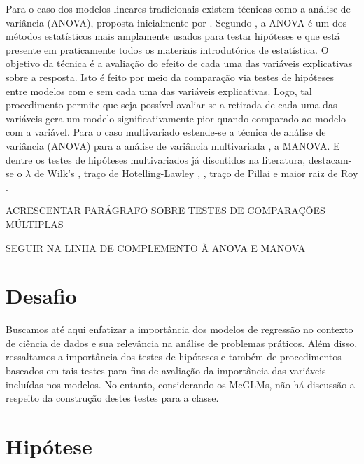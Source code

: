 Para o caso dos modelos lineares tradicionais existem técnicas como a análise de variância (ANOVA), proposta inicialmente por \citet{anova_fisher}. Segundo \citet{anova1}, a ANOVA é um dos métodos estatísticos mais amplamente usados para testar hipóteses e que está presente em praticamente todos os materiais introdutórios de estatística. O objetivo da técnica é a avaliação do efeito de cada uma das variáveis explicativas sobre a resposta. Isto é feito por meio da comparação via testes de hipóteses entre modelos com e sem cada uma das variáveis explicativas. Logo, tal procedimento permite que seja possível avaliar se a retirada de cada uma das variáveis gera um modelo significativamente pior quando comparado ao modelo com a variável. Para o caso multivariado estende-se a técnica de análise de variância (ANOVA) para a análise de variância  multivariada \citep{manova}, a MANOVA. E dentre os testes de hipóteses multivariados já discutidos na literatura, destacam-se o $\lambda$ de Wilk's \citep{wilks}, traço de Hotelling-Lawley \citep{lawley}, \citep{hotelling}, traço de Pillai \citep{pillai} e maior raiz de Roy \citep{roy}. 


ACRESCENTAR PARÁGRAFO SOBRE TESTES DE COMPARAÇÕES MÚLTIPLAS

SEGUIR NA LINHA DE COMPLEMENTO À ANOVA E MANOVA


\section{Desafio}

Buscamos até aqui enfatizar a importância dos modelos de regressão no contexto de ciência de dados e sua relevância na análise de problemas práticos. Além disso, ressaltamos a importância dos testes de hipóteses e também de procedimentos baseados em tais testes para fins de avaliação da importância das variáveis incluídas nos modelos. No entanto, considerando os McGLMs, não há discussão a respeito da construção destes testes para a classe.


\section{Hipótese}

